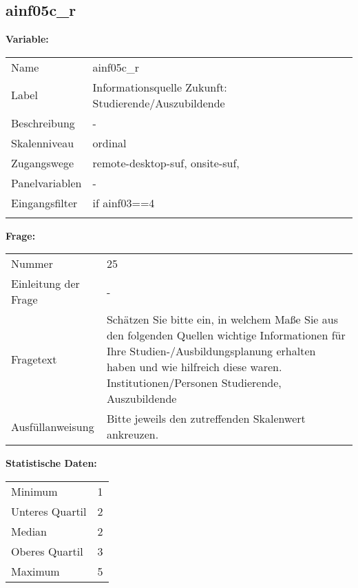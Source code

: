 	
	
	\subsection{ainf05c\_r}
	\label{subSection:ainf05c_r}

	\noindent\textbf{Variable:}\\
		\begin{tabular}{lL{11.3cm}}
			\label{tableVariable:ainf05c_r}
			Name & ainf05c\_r \\
			Label & Informationsquelle Zukunft: Studierende/Auszubildende \\
			Beschreibung & - \\
			Skalenniveau & ordinal \\
			Zugangswege &
				remote-desktop-suf,
				onsite-suf,
 \\
			Panelvariablen & -
			 \\
			Eingangsfilter & if ainf03==4 \\
 \\
		\end{tabular}

		\vspace*{1 cm}
		\noindent\textbf{Frage:}\\
		\begin{tabular}{lL{11.3cm}}
			\label{tableQuestion:ainf05c_r}
			Nummer & 25 \\
			Einleitung der Frage & - \\
			Fragetext & Schätzen Sie bitte ein, in welchem Maße Sie aus den folgenden Quellen wichtige Informationen für Ihre Studien-/Ausbildungsplanung erhalten haben und wie hilfreich diese waren.
Institutionen/Personen
Studierende, Auszubildende \\
			Ausfüllanweisung & Bitte jeweils den zutreffenden Skalenwert ankreuzen. \\
		\end{tabular}


		\vspace*{1 cm}
		\noindent\textbf{Statistische Daten:}\\
			\begin{tabular}{ll}
				\label{tableStatistics:ainf05c_r}
					Minimum & 1 \\
					Unteres Quartil & 2 \\
					Median & 2 \\
					Oberes Quartil & 3 \\
					Maximum & 5 \\
			\end{tabular}



